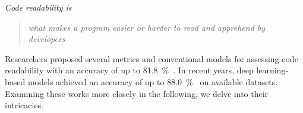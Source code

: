 \documentclass[%
class=scrreprt,
chapterprefix=false,%
open=right,%
twoside=true,%
paper=a4,%
logofile={Logo\_zentral\_farbig\_EN.png},%
thesistype=master,%
UKenglish,%
]{se2thesis}
\theoremstyle{definition}
\newtheorem{definition}{Definition}[section]
\newcommand{\citeclassicmodels}{\cite{buse2009learning, posnett2011simpler, dorn2012general, scalabrino2018comprehensive}\xspace}
\newcommand{\citedeepmodels}{\cite{mi2018inception, mi2018improving, sharma2020egan, mi2022towards, mi2022rank, mi2023graph}\xspace}
\begin{document}
	\textit{Code readability is} \blockcquote{oliveira2020evaluating}{\textit{what makes a program easier or harder to read and apprehend by developers}}.
	

	Researchers proposed several metrics and conventional models for assessing code readability with an accuracy of up to 81.8~\%~\citeclassicmodels. In recent years, deep learning-based models achieved an accuracy of up to 88.0~\%~\citedeepmodels on available datasets. 
	Examining these works more closely in the following, we delve into their intricacies.
	
\end{document}
